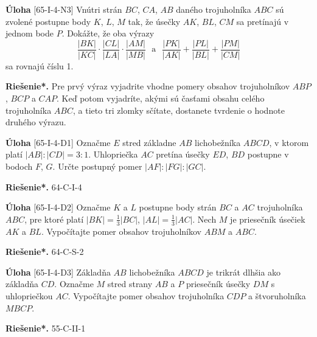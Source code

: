 \documentclass{article}
\newcommand{\rieh}{\textbf{Riešenie*.} }
\newcommand{\problem}[3]{
  \begin{tcolorbox}[breakable,notitle,boxrule=0pt,colback=light-gray,colframe=light-gray]
    \textbf{Úloha}
    [#1] #2
  \end{tcolorbox}
  \noindent#3
}
\begin{document}
\problem{65-I-4-N3}{
Vnútri strán $BC$, $CA$, $AB$ daného trojuholníka $ABC$ sú zvolené postupne body $K$, $L$, $M$ tak, že úsečky $AK$, $BL$, $CM$ sa pretínajú v jednom bode $P$. Dokážte, že oba výrazy
$$\frac{|BK|}{|KC|}\cdot \frac{|CL|}{|LA|}\cdot \frac{|AM|}{|MB|} \ \ \ \text{a} \ \ \ \frac{|P K|}{|AK|}+\frac{|P L|}{|BL|}+\frac{|P M|}{|CM|}$$
sa rovnajú číslu 1. 
}{
\rieh Pre prvý výraz vyjadrite vhodne pomery obsahov trojuholníkov $ABP$, $BCP$ a $CAP$. Keď potom vyjadríte, akými sú časťami obsahu celého trojuholníka $ABC$, a tieto tri zlomky sčítate, dostanete tvrdenie o hodnote druhého výrazu.
}


\problem{65-I-4-D1}{
Označme $E$ stred základne $AB$ lichobežníka $ABCD$, v ktorom platí $|AB| : |CD| = 3 : 1$. Uhlopriečka $AC$ pretína úsečky $ED$, $BD$ postupne v bodoch $F$, $G$. Určte postupný pomer $|AF | : |F G| : |GC|$.
}{
\rieh 64-C-I-4
}


\problem{65-I-4-D2}{
Označme $K$ a $L$ postupne body strán $BC$ a $AC$ trojuholníka $ABC$, pre ktoré platí $|BK| =\frac{1}{3}|BC|$, $|AL| =\frac{1}{3}|AC|$. Nech $M$ je priesečník úsečiek $AK$ a $BL$. Vypočítajte pomer obsahov trojuholníkov $ABM$ a $ABC$.
}{
\rieh 64-C-S-2
}


\problem{65-I-4-D3}{
Základňa $AB$ lichobežníka $ABCD$ je trikrát dlhšia ako základňa $CD$. Označme $M$ stred strany $AB$ a $P$ priesečník úsečky $DM$ s uhlopriečkou $AC$. Vypočítajte pomer obsahov trojuholníka $CDP$ a štvoruholníka $MBCP$.
}{
\rieh 55-C-II-1
}
\end{document}
